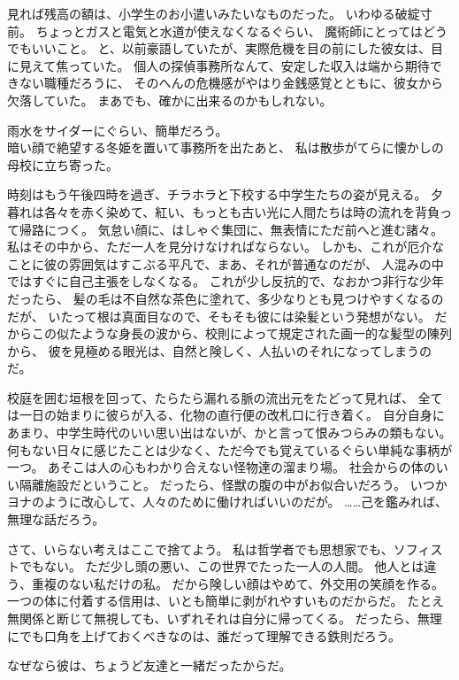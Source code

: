 \documentclass[../HiganMain]{subfiles}
\begin{document}
見れば残高の額は、小学生のお小遣いみたいなものだった。
いわゆる破綻寸前。
ちょっとガスと電気と水道が使えなくなるぐらい、
魔術師にとってはどうでもいいこと。
と、以前豪語していたが、実際危機を目の前にした彼女は、目に見えて焦っていた。
個人の探偵事務所なんて、安定した収入は端から期待できない職種だろうに、
そのへんの危機感がやはり金銭感覚とともに、彼女から欠落していた。
まあでも、確かに出来るのかもしれない。

雨水をサイダーにぐらい、簡単だろう。\\

暗い顔で絶望する冬姫を置いて事務所を出たあと、
私は散歩がてらに懐かしの母校に立ち寄った。

時刻はもう午後四時を過ぎ、チラホラと下校する中学生たちの姿が見える。
夕暮れは各々を赤く染めて、紅い、もっとも古い光に人間たちは時の流れを背負って帰路につく。
気怠い顔に、はしゃぐ集団に、無表情にただ前へと進む諸々。
私はその中から、ただ一人を見分けなければならない。
しかも、これが厄介なことに彼の雰囲気はすこぶる平凡で、まあ、それが普通なのだが、
人混みの中ではすぐに自己主張をしなくなる。
これが少し反抗的で、なおかつ非行な少年だったら、
髪の毛は不自然な茶色に塗れて、多少なりとも見つけやすくなるのだが、
いたって根は真面目なので、そもそも彼には染髪という発想がない。
だからこの似たような身長の波から、校則によって規定された画一的な髪型の陳列から、
彼を見極める眼光は、自然と険しく、人払いのそれになってしまうのだ。

校庭を囲む垣根を回って、たらたら漏れる脈の流出元をたどって見れば、
全ては一日の始まりに彼らが入る、化物の直行便の改札口に行き着く。
自分自身にあまり、中学生時代のいい思い出はないが、かと言って恨みつらみの類もない。
何もない日々に感じたことは少なく、ただ今でも覚えているぐらい単純な事柄が一つ。
あそこは人の心もわかり合えない怪物達の溜まり場。
社会からの体のいい隔離施設だということ。
だったら、怪獣の腹の中がお似合いだろう。
いつかヨナのように改心して、人々のために働ければいいのだが。
……己を鑑みれば、無理な話だろう。

さて、いらない考えはここで捨てよう。
私は哲学者でも思想家でも、ソフィストでもない。
ただ少し頭の悪い、この世界でたった一人の人間。
他人とは違う、重複のない私だけの私。
だから険しい顔はやめて、外交用の笑顔を作る。
一つの体に付着する信用は、いとも簡単に剥がれやすいものだからだ。
たとえ無関係と断じて無視しても、いずれそれは自分に帰ってくる。
だったら、無理にでも口角を上げておくべきなのは、誰だって理解できる鉄則だろう。

なぜなら彼は、ちょうど友達と一緒だったからだ。\\
\end{document}
